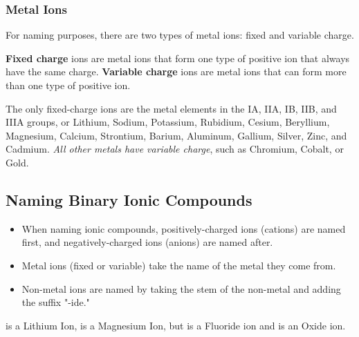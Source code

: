 \subsubsection{Metal Ions}

\noindent
For naming purposes, there are two types of metal ions: fixed and variable charge.

\begin{defn}
\textbf{Fixed charge} ions are metal ions that form one type of positive ion that always have the same charge. \textbf{Variable charge} ions are metal ions that can form more than one type of positive ion.
\end{defn}

\noindent
The only fixed-charge ions are the metal elements in the IA, IIA, IB, IIB, and IIIA groups, or Lithium, Sodium, Potassium, Rubidium, Cesium, Beryllium, Magnesium, Calcium, Strontium, Barium, Aluminum, Gallium, Silver, Zinc, and Cadmium. \textit{All other metals have variable charge}, such as Chromium, Cobalt, or Gold.

\subsection{Naming Binary Ionic Compounds}

\begin{itemize}
\item When naming ionic compounds, positively-charged ions (cations) are named first, and negatively-charged ions (anions) are named after.
\item Metal ions (fixed or variable) take the name of the metal they come from.
\item Non-metal ions are named by taking the stem of the non-metal and adding the suffix "-ide."
\end{itemize}

\begin{example}
 is a Lithium Ion,  is a Magnesium Ion, but  is a Fluoride ion and  is an Oxide ion.
\end{example}

\noindent
{}

